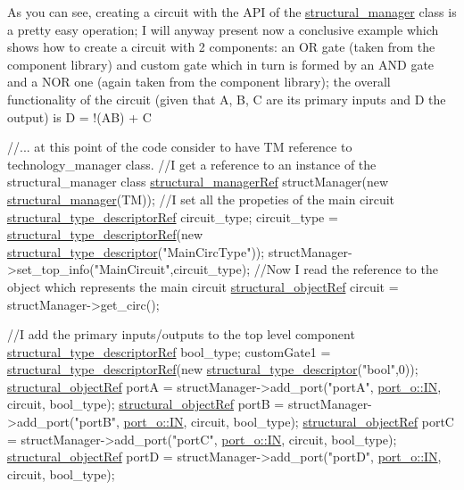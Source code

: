 As you can see, creating a circuit with the A\+PI of the \hyperlink{classstructural__manager}{structural\+\_\+manager} class is a pretty easy operation; I will anyway present now a conclusive example which shows how to create a circuit with 2 components\+: an OR gate (taken from the component library) and custom gate which in turn is formed by an A\+ND gate and a N\+OR one (again taken from the component library); the overall functionality of the circuit (given that A, B, C are its primary inputs and D the output) is D = !(AB) + C


\begin{DoxyCode}
\textcolor{comment}{//... at this point of the code consider to have TM reference to technology\_manager class.}
\textcolor{comment}{//I get a reference to an instance of the structural\_manager class}
\hyperlink{structrefcount}{structural\_managerRef} structManager(\textcolor{keyword}{new} \hyperlink{classstructural__manager}{structural\_manager}(TM));
\textcolor{comment}{//I set all the propeties of the main circuit}
\hyperlink{structrefcount}{structural\_type\_descriptorRef} circuit\_type;
circuit\_type = \hyperlink{structural__objects_8hpp_a219296792577e3292783725961506c83}{structural\_type\_descriptorRef}(\textcolor{keyword}{new} 
      \hyperlink{structstructural__type__descriptor}{structural\_type\_descriptor}(\textcolor{stringliteral}{"MainCircType"}));
structManager->set\_top\_info(\textcolor{stringliteral}{"MainCircuit"},circuit\_type);
\textcolor{comment}{//Now I read the reference to the object which represents the main circuit}
\hyperlink{structrefcount}{structural\_objectRef} circuit = structManager->get\_circ(); 


\textcolor{comment}{//I add the primary inputs/outputs to the top level component}
\hyperlink{structrefcount}{structural\_type\_descriptorRef} bool\_type;
customGate1 = \hyperlink{structural__objects_8hpp_a219296792577e3292783725961506c83}{structural\_type\_descriptorRef}(\textcolor{keyword}{new} 
      \hyperlink{structstructural__type__descriptor}{structural\_type\_descriptor}(\textcolor{stringliteral}{"bool"},0));
\hyperlink{structrefcount}{structural\_objectRef} portA = structManager->add\_port(\textcolor{stringliteral}{"portA"}, 
      \hyperlink{structport__o_adb254df5665ff28b0769491cc3899fd5aa135fbd4d182c73be50d31f88e981284}{port\_o::IN}, circuit, bool\_type);
\hyperlink{structrefcount}{structural\_objectRef} portB = structManager->add\_port(\textcolor{stringliteral}{"portB"}, 
      \hyperlink{structport__o_adb254df5665ff28b0769491cc3899fd5aa135fbd4d182c73be50d31f88e981284}{port\_o::IN}, circuit, bool\_type);
\hyperlink{structrefcount}{structural\_objectRef} portC = structManager->add\_port(\textcolor{stringliteral}{"portC"}, 
      \hyperlink{structport__o_adb254df5665ff28b0769491cc3899fd5aa135fbd4d182c73be50d31f88e981284}{port\_o::IN}, circuit, bool\_type);
\hyperlink{structrefcount}{structural\_objectRef} portD = structManager->add\_port(\textcolor{stringliteral}{"portD"}, 
      \hyperlink{structport__o_adb254df5665ff28b0769491cc3899fd5aa135fbd4d182c73be50d31f88e981284}{port\_o::IN}, circuit, bool\_type);


\end{DoxyCode}

